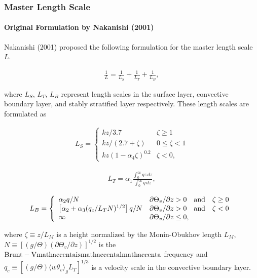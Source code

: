 \hypertarget{master-length-scale}{%
\subsubsection{Master Length Scale}\label{master-length-scale}}

\hypertarget{original-formulation-by-nakanishi-2001}{%
\paragraph{Original Formulation by Nakanishi (2001)}\label{original-formulation-by-nakanishi-2001}}

Nakanishi (2001) proposed the following formulation for the master length scale \(L\).

\begin{eqnarray}\frac{1}{L}=\frac{1}{L_S}+\frac{1}{L_T}+\frac{1}{L_B} \label{p-dif.1}, \end{eqnarray}

where \(L_S\), \(L_T\), \(L_B\) represent length scales in the surface layer, convective boundary layer, and stably stratified layer respectively. These length scales are formulated as

\begin{eqnarray}
L_S=\left\{
    \begin{array}{lr}
      kz/3.7 &\zeta\ge 1\\
      kz/(2.7+\zeta) &0\le\zeta< 1\\
      kz(1-\alpha_4\zeta)^{0.2} &\zeta< 0,
    \end{array}
  \right.
\end{eqnarray}

\begin{eqnarray}L_T=\alpha_1\frac{\displaystyle \int_0^\infty{qz}\,dz}{\displaystyle \int_0^\infty{q}\,dz},\end{eqnarray}

\begin{eqnarray}
L_B=\left\{
    \begin{array}{ll}
      \alpha_2 q/N &\partial\Theta_v/\partial z> 0 \quad\rm{and}\quad\zeta\ge 0\\
      \left[\alpha_2+\alpha_3(q_c/L_TN)^{1/2}\right]q/N &\partial\Theta_v/\partial z> 0 \quad\rm{and}\quad\zeta< 0\\
      \infty &\partial\Theta_v/\partial z\le 0,
    \end{array}
  \right.
\end{eqnarray}

where \(\zeta\equiv z/L_M\) is a height normalized by the Monin-Obukhov length \(L_M\), \(N\equiv\left[(g/\Theta)(\partial\Theta_v/\partial z)\right]^{1/2}\) is the
\(\mathrm{Brunt-V\\mathaccent{a}is\\mathaccent{a}l\\mathaccent{a}}\) frequency and \(q_c\equiv [(g/\Theta)\langle w\theta_v \rangle_gL_T]^{1/3}\) is a velocity scale in the convective boundary layer.

